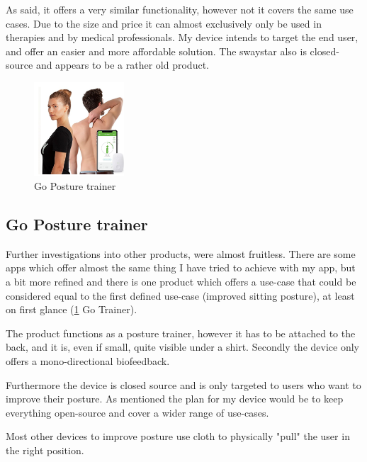 As said, it offers a very similar functionality, however not it covers the same use cases. Due to the size and price it can almost exclusively only be used in therapies and by medical professionals. My device intends to target the end user, and offer an easier and more affordable solution. The swaystar also is closed-source and appears to be a rather old product.
\cite{SwayStar47:online}

\newpage

\begin{figure}
  \begin{center}
\includegraphics[width=0.3\textwidth]{images/Screenshot_3.png}
  \end{center}
  \caption{Go Posture trainer}
  \label{fig:gotrainer}
\end{figure}

\subsection{Go Posture trainer}

Further investigations into other products, were almost fruitless. There are some apps which offer almost the same thing I have tried to achieve with my app, but a bit more refined and there is one product which offers a use-case that could be considered equal to the first defined use-case (improved sitting posture), at least on first glance (\ref{fig:gotrainer} Go Trainer). 

The product functions as a posture trainer, however it has to be attached to the back, and it is, even if small, quite visible under a shirt. Secondly the device only offers a mono-directional biofeedback. \cite{HowToImp2:online}

Furthermore the device is closed source and is only targeted to users who want to improve their posture. As mentioned the plan for my device would be to keep everything open-source and cover a wider range of use-cases. 

Most other devices to improve posture use cloth to physically "pull" the user in the right position.

